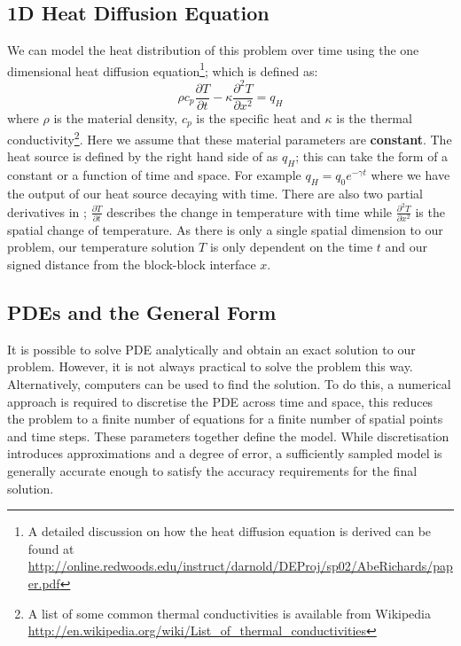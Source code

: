 \subsection{1D Heat Diffusion Equation}
We can model the heat distribution of this problem over time using the one
dimensional heat diffusion equation\footnote{A detailed discussion on how the
heat diffusion equation is derived can be found at
\url{
http://online.redwoods.edu/instruct/darnold/DEProj/sp02/AbeRichards/paper.pdf}};
which is defined as:
\begin{equation}
\rho c_p \frac{\partial T}{\partial t} - \kappa \frac{\partial^{2}
T}{\partial x^{2}} = q_H 
\label{eqn:hd}
\end{equation}
where $\rho$ is the material density, $c_p$ is the specific heat and
$\kappa$ is the thermal 
conductivity\footnote{A list of some common thermal conductivities is available
from Wikipedia
\url{http://en.wikipedia.org/wiki/List_of_thermal_conductivities}}. Here we
assume that these material 
parameters are \textbf{constant}. 
The heat source is defined by the right hand side of  as
$q_{H}$; this can take the form of a constant or a function of time and
space. For example $q_{H} = q_{0}e^{-\gamma t}$ where we have
the output of our heat source decaying with time. There are also two partial
derivatives in ; $\frac{\partial T}{\partial t}$ describes the
change in temperature with time while $\frac{\partial ^2 T}{\partial x^2}$ is
the spatial change of temperature. As there is only a single spatial dimension
to our problem, our temperature solution $T$ is only dependent on the time $t$
and our signed distance from the block-block interface $x$.

\subsection{PDEs and the General Form}
It is possible to solve PDE  analytically and obtain an exact
solution to our problem. However, it is not always practical to solve the
problem this way. Alternatively, computers can be used to find the solution. To
do this, a numerical approach is required to discretise 
the PDE  across time and space, this reduces the problem to a
finite number of equations for a finite number of spatial points and time steps.
These parameters together define the model. While discretisation introduces
approximations and a degree of error, a sufficiently sampled model is generally
accurate enough to satisfy the accuracy requirements for the final solution.

